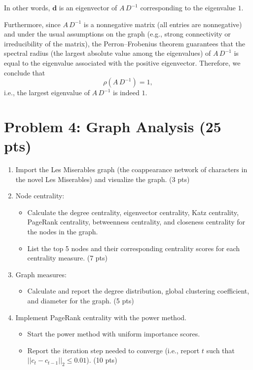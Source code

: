 \documentclass[a4paper,12pt]{article}
\begin{document}
\begin{enumerate}
In other words, \(\mathbf{d}\) is an eigenvector of \(A\,D^{-1}\) corresponding to the eigenvalue \(1\).

Furthermore, since \(A\,D^{-1}\) is a nonnegative matrix (all entries are nonnegative) and under the usual assumptions on the graph (e.g., strong connectivity or irreducibility of the matrix), the Perron--Frobenius theorem guarantees that the spectral radius (the largest absolute value among the eigenvalues) of \(A\,D^{-1}\) is equal to the eigenvalue associated with the positive eigenvector. Therefore, we conclude that
\[
\rho(A\,D^{-1}) = 1,
\]
i.e., the largest eigenvalue of \(A\,D^{-1}\) is indeed \(1\).
\end{enumerate}




\section{Problem 4: Graph Analysis (25 pts)}

\begin{enumerate}
    \item Import the Les Miserables graph (the coappearance network of characters in the novel Les Miserables) and visualize the graph. (3 pts)
    \item Node centrality:
    \begin{itemize}
        \item Calculate the degree centrality, eigenvector centrality, Katz centrality, PageRank centrality, betweenness centrality, and closeness centrality for the nodes in the graph.
        \item List the top 5 nodes and their corresponding centrality scores for each centrality measure. (7 pts)
    \end{itemize}
    \item Graph measures:
    \begin{itemize}
        \item Calculate and report the degree distribution, global clustering coefficient, and diameter for the graph. (5 pts)
    \end{itemize}
    \item Implement PageRank centrality with the power method.
    \begin{itemize}
        \item Start the power method with uniform importance scores.
        \item Report the iteration step needed to converge (i.e., report \( t \) such that \( ||c_t - c_{t-1}||_2 \leq 0.01 \)). (10 pts)
    \end{itemize}
\end{enumerate}
\end{document}
